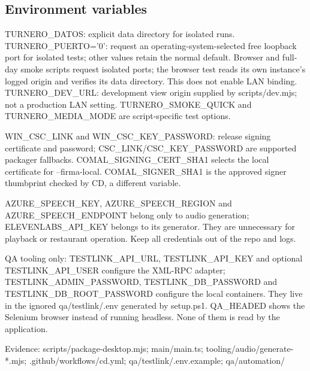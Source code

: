 \subsection{Environment variables}

TURNERO\_DATOS: explicit data directory for isolated runs. TURNERO\_PUERTO='0': request an operating-system-selected free loopback port for isolated tests; other values retain the normal default. Browser and full-day smoke scripts request isolated ports; the browser test reads its own instance's logged origin and verifies its data directory. This does not enable LAN binding. TURNERO\_DEV\_URL: development view origin supplied by scripts/dev.mjs; not a production LAN setting. TURNERO\_SMOKE\_QUICK and TURNERO\_MEDIA\_MODE are script-specific test options.

WIN\_CSC\_LINK and WIN\_CSC\_KEY\_PASSWORD: release signing certificate and password; CSC\_LINK/CSC\_KEY\_PASSWORD are supported packager fallbacks. COMAL\_SIGNING\_CERT\_SHA1 selects the local certificate for --firma-local. COMAL\_SIGNER\_SHA1 is the approved signer thumbprint checked by CD, a different variable.

AZURE\_SPEECH\_KEY, AZURE\_SPEECH\_REGION and AZURE\_SPEECH\_ENDPOINT belong only to audio generation; ELEVENLABS\_API\_KEY belongs to its generator. They are unnecessary for playback or restaurant operation. Keep all credentials out of the repo and logs.

QA tooling only: TESTLINK\_API\_URL, TESTLINK\_API\_KEY and optional TESTLINK\_API\_USER configure the XML-RPC adapter; TESTLINK\_ADMIN\_PASSWORD, TESTLINK\_DB\_PASSWORD and TESTLINK\_DB\_ROOT\_PASSWORD configure the local containers. They live in the ignored qa/testlink/.env generated by setup.ps1. QA\_HEADED shows the Selenium browser instead of running headless. None of them is read by the application.

Evidence: scripts/package-desktop.mjs; main/main.ts; tooling/audio/generate-*.mjs; .github/workflows/cd.yml; qa/testlink/.env.example; qa/automation/
